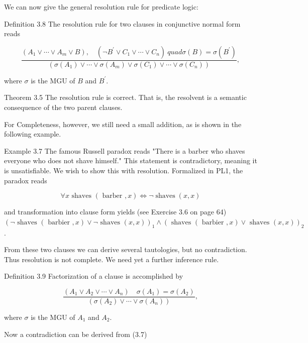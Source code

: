\documentclass[10pt]{article}
\begin{document}
We can now give the general resolution rule for predicate logic:

Definition 3.8 The resolution rule for two clauses in conjunctive normal form reads


\begin{equation*}
\frac{\left(A_{1} \vee \cdots \vee A_{m} \vee B\right), \quad\left(\neg B^{\prime} \vee C_{1} \vee \cdots \vee C_{n}\right) \
quad \sigma(B)=\sigma\left(B^{\prime}\right)}{\left(\sigma\left(A_{1}\right) \vee \cdots \vee \sigma\left(A_{m}\right) \vee \sigma\left(C_{1}\right) \vee \cdots \vee \sigma\left(C_{n}\right)\right)}, \tag{3.6}
\end{equation*}


where $\sigma$ is the MGU of $B$ and $B^{\prime}$.

Theorem 3.5 The resolution rule is correct. That is, the resolvent is a semantic consequence of the two parent clauses.

For Completeness, however, we still need a small addition, as is shown in the following example.

Example 3.7 The famous Russell paradox reads "There is a barber who shaves everyone who does not shave himself." This statement is contradictory, meaning it is unsatisfiable. We wish to show this with resolution. Formalized in PL1, the paradox reads

$$
\forall x \text { shaves }(\text { barber }, x) \Leftrightarrow \neg \operatorname{shaves}(x, x)
$$

and transformation into clause form yields (see Exercise 3.6 on page 64)\\
$(\neg \text { shaves }(\text { barbier }, x) \vee \neg \text { shaves }(x, x))_{1} \wedge(\text { shaves }(\text { barbier }, x) \vee \text { shaves }(x, x))_{2}$.

From these two clauses we can derive several tautologies, but no contradiction. Thus resolution is not complete. We need yet a further inference rule.

Definition 3.9 Factorization of a clause is accomplished by

$$
\frac{\left(A_{1} \vee A_{2} \vee \cdots \vee A_{n}\right) \quad \sigma\left(A_{1}\right)=\sigma\left(A_{2}\right)}{\left(\sigma\left(A_{2}\right) \vee \cdots \vee \sigma\left(A_{n}\right)\right)},
$$

where $\sigma$ is the MGU of $A_{1}$ and $A_{2}$.

Now a contradiction can be derived from (3.7)
\end{document}
